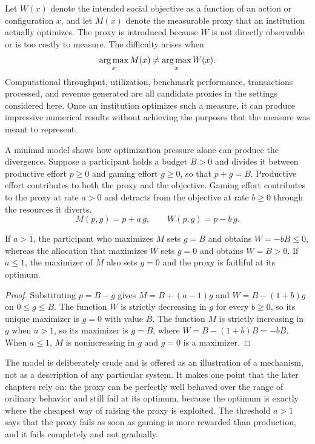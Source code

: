 Let $W(x)$ denote the intended social objective as a function of an action or configuration $x$, and let $M(x)$ denote the measurable proxy that an institution actually optimizes. The proxy is introduced because $W$ is not directly observable or is too costly to measure. The difficulty arises when
\[
\operatorname*{arg\,max}_x M(x) \neq \operatorname*{arg\,max}_x W(x).
\]
Computational throughput, utilization, benchmark performance, transactions processed, and revenue generated are all candidate proxies in the settings considered here. Once an institution optimizes such a measure, it can produce impressive numerical results without achieving the purposes that the measure was meant to represent.

A minimal model shows how optimization pressure alone can produce the divergence. Suppose a participant holds a budget $B>0$ and divides it between productive effort $p\ge 0$ and gaming effort $g\ge 0$, so that $p+g=B$. Productive effort contributes to both the proxy and the objective. Gaming effort contributes to the proxy at rate $a>0$ and detracts from the objective at rate $b\ge 0$ through the resources it diverts.
\[
M(p,g)=p+a\,g,\qquad W(p,g)=p-b\,g.
\]

\begin{proposition}
\label{prop:goodhart}
If $a>1$, the participant who maximizes $M$ sets $g=B$ and obtains $W=-bB\le 0$, whereas the allocation that maximizes $W$ sets $g=0$ and obtains $W=B>0$. If $a\le 1$, the maximizer of $M$ also sets $g=0$ and the proxy is faithful at its optimum.
\end{proposition}

\begin{proof}
Substituting $p=B-g$ gives $M=B+(a-1)g$ and $W=B-(1+b)g$ on $0\le g\le B$. The function $W$ is strictly decreasing in $g$ for every $b\ge 0$, so its unique maximizer is $g=0$ with value $B$. The function $M$ is strictly increasing in $g$ when $a>1$, so its maximizer is $g=B$, where $W=B-(1+b)B=-bB$. When $a\le 1$, $M$ is nonincreasing in $g$ and $g=0$ is a maximizer.
\end{proof}

The model is deliberately crude and is offered as an illustration of a mechanism, not as a description of any particular system. It makes one point that the later chapters rely on: the proxy can be perfectly well behaved over the range of ordinary behavior and still fail at its optimum, because the optimum is exactly where the cheapest way of raising the proxy is exploited. The threshold $a>1$ says that the proxy fails as soon as gaming is more rewarded than production, and it fails completely and not gradually.

